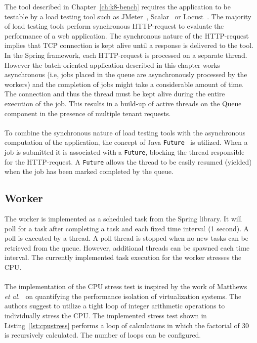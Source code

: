 \noindent The tool described in Chapter~\ref{ch:k8-bench} requires the application to be testable by a load testing tool such as JMeter~\cite{jmeter}, Scalar~\cite{heyman2014scalability} or Locust~\cite{locust}.  The majority of load testing tools perform synchronous HTTP-request to evaluate the performance of a web application.  The synchronous nature of the HTTP-request implies that TCP connection is kept alive until a response is delivered to the tool. In the Spring framework, each HTTP-request is processed on a separate thread.  However the batch-oriented application described in this chapter works asynchronous (i.e, jobs placed in the queue are asynchronously processed by the workers) and the completion of jobs might take a considerable amount of time.  The connection and thus the thread must be kept alive during the entire execution of the job. This results in a build-up of active threads on the Queue component in the presence of multiple tenant requests. \\\\
To combine the synchronous nature of load testing tools with the asynchronous computation of the application, the concept of Java  \texttt{Future}~\cite{future} is utilized. When a job is submitted it is associated with a \texttt{Future}, blocking the thread responsible for the HTTP-request. A  \texttt{Future} allows the thread to be easily resumed (yielded) when the job has been marked completed by the queue.

\subsection{Worker}
The worker is implemented as a scheduled task from the Spring library. It will poll for a task after completing a task and each  fixed time interval (1 second). A poll is executed by a thread. A poll thread is stopped when no new tasks can be retrieved from the queue. However, additional threads can be spawned each time interval.   The currently implemented task execution for the worker stresses the CPU.\\\\
The implementation of the CPU stress test is inspired by the work of Matthews\textit{ et al.}~\cite{matthews2007quantifying} on quantifying the performance isolation of virtualization systems. The authors suggest to utilize a tight loop of integer arithmetic operations to individually stress the CPU.  The implemented stress test  shown in Listing~\ref{lst:cpustress} performs a loop of calculations in which the factorial of 30 is recursively calculated. The number of loops can be configured.

